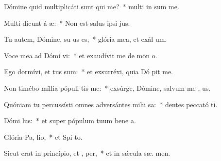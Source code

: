 \item Dómine quid multiplicáti sunt qui  me?~* multi in sum me.
\item Multi dicunt á æ:~* Non est salus ipsi   jus.
\item Tu autem, Dómine, su us es,~* glória mea, et exál  um.
\item Voce mea ad Dómi vi:~* et exaudívit me de mon  o.
\item Ego dormívi, et tus sum:~* et exsurréxi, quia Dó pit me.
\item Non timébo míllia pópuli tis me:~* exsúrge, Dómine, salvum me ,  us.
\item Quóniam tu percussísti omnes adversántes mihi  sa:~* dentes peccató ti.
\item Dómi  lus:~* et super pópulum tuum bene a.
\item Glória Pa,  lio,~* et Spi to.
\item Sicut erat in princípio, et ,  per,~* et in sǽcula sæ. men.
